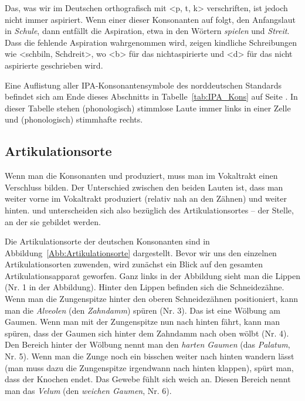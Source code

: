 Das, was wir im Deutschen orthografisch mit <p, t, k> verschriften, ist jedoch nicht immer aspiriert. Wenn einer dieser Konsonanten auf \textipa{[S]} folgt, den Anfangslaut in \textit{Schule}, dann entfällt die Aspiration, etwa in den Wörtern \textit{spielen} und \textit{Streit}. Dass die fehlende Aspiration wahrgenommen wird, zeigen kindliche Schreibungen wie <schbiln, Schdreit>, wo <b> für das nichtaspirierte \textipa{[p]} und <d> für das nicht aspirierte \textipa{[t]} geschrieben wird. 
 
Eine Auflistung aller IPA-Konsonantensymbole des norddeutschen Standards befindet sich am Ende dieses Abschnitts in Tabelle~\ref{tab:IPA_Kons} auf Seite \pageref{tab:IPA_Kons}. In dieser Tabelle stehen (phonologisch) stimmlose Laute immer links in einer Zelle und (phonologisch) stimmhafte rechts.


\subsection{Artikulationsorte}\label{sec:Artikulationsorte}

Wenn man die Konsonanten \textipa{[t]} und \textipa{[k]} produziert, muss man im Vokaltrakt einen Verschluss bilden. Der Unterschied zwischen den beiden Lauten ist, dass man \textipa{[t]} weiter vorne im Vokaltrakt produziert (relativ nah an den Zähnen) und \textipa{[k]} weiter hinten. \textipa{[t]} und \textipa{[k]} unterscheiden sich also bezüglich des Artikulationsortes -- der Stelle, an der sie gebildet werden. 

Die Artikulationsorte der deutschen Konsonanten sind in Abbildung~\ref{Abb:Artikulationsorte} dargestellt. Bevor wir uns den einzelnen Artikulationsorten zuwenden, wird zunächst ein Blick auf den gesamten Artikulationsapparat geworfen. Ganz links in der Abbildung sieht man die Lippen (Nr. 1 in der Abbildung). Hinter den Lippen befinden sich die Schneidezähne. Wenn man die Zungenspitze hinter den oberen Schneidezähnen positioniert, kann man die \textit{Alveolen} (den \textit{Zahndamm}) spüren (Nr. 3). Das ist eine Wölbung am Gaumen. Wenn man mit der Zungenspitze nun nach hinten fährt, kann man spüren, dass der Gaumen sich hinter dem Zahndamm nach oben wölbt (Nr. 4). Den Bereich hinter der Wölbung nennt man den \textit{harten Gaumen} (das \textit{Palatum}, Nr. 5). Wenn man die Zunge noch ein bisschen weiter nach hinten wandern lässt (man muss dazu die Zungenspitze irgendwann nach hinten klappen), spürt man, dass der Knochen endet. Das Gewebe fühlt sich weich an. Diesen Bereich nennt man das \textit{Velum} (den \textit{weichen Gaumen}, Nr. 6). 

